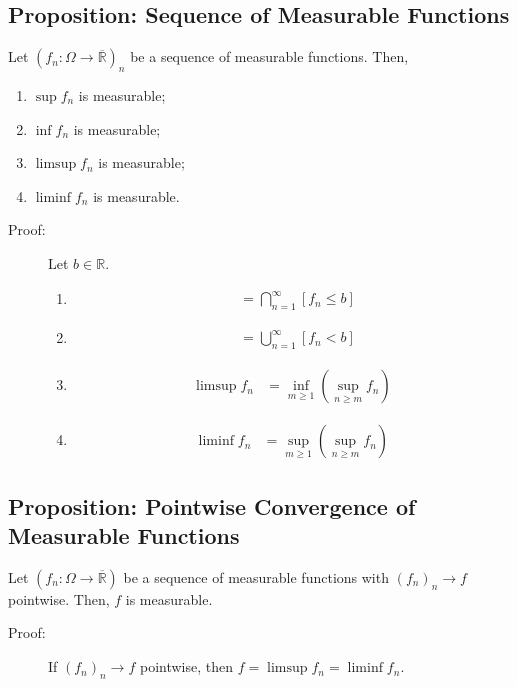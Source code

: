\documentclass[10pt]{extarticle}
\newcommand{\R}{\mathbb{R}}
\begin{document}
  \subsection{Proposition: Sequence of Measurable Functions}%
  Let $\left(f_n: \Omega \rightarrow \overline{\R}\right)_{n}$ be a sequence of measurable functions. Then,
  \begin{enumerate}[(1)]
    \item $\sup f_n$ is measurable;
    \item $\inf f_n$ is measurable;
    \item $\limsup f_n$ is measurable;
    \item $\liminf f_n$ is measurable.
  \end{enumerate}
  \begin{description}
    \item[Proof:] Let $b\in \R$.
      \begin{enumerate}[(1)]
        \item 
          \begin{align*}
            [\sup f_n \leq b] &= \bigcap_{n=1}^{\infty}[f_n \leq b]
          \end{align*}
        \item 
          \begin{align*}
            [\inf f_n < b] &= \bigcup_{n=1}^{\infty}[f_n < b]
          \end{align*}
        \item 
          \begin{align*}
            \limsup f_n &= \inf_{m\geq 1}\left(\sup_{n\geq m}f_n\right)
          \end{align*}
        \item 
          \begin{align*}
            \liminf f_n &= \sup_{m\geq 1}\left(\sup_{n\geq m}f_n\right)
          \end{align*}
      \end{enumerate}
  \end{description}
  \subsection{Proposition: Pointwise Convergence of Measurable Functions}%
  Let $\left(f_{n}:\Omega \rightarrow \overline{\R}\right)$ be a sequence of measurable functions with $(f_n)_n \rightarrow f$ pointwise. Then, $f$ is measurable.
  \begin{description}
    \item[Proof:] If $(f_n)_n \rightarrow f$ pointwise, then $f = \limsup f_n = \liminf f_n$.
  \end{description}
\end{document}
